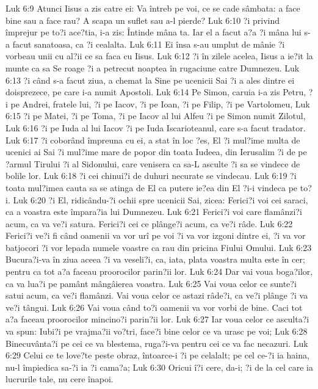 Luk 6:9  Atunci Iisus a zis catre ei: Va întreb pe voi, ce se cade sâmbata: a face bine sau a face rau? A scapa un suflet sau a-l pierde?
Luk 6:10  ?i privind împrejur pe to?i ace?tia, i-a zis: Întinde mâna ta. Iar el a facut a?a ?i mâna lui s-a facut sanatoasa, ca ?i cealalta.
Luk 6:11  Ei însa s-au umplut de mânie ?i vorbeau unii cu al?ii ce sa faca cu Iisus.
Luk 6:12  ?i în zilele acelea, Iisus a ie?it la munte ca sa Se roage ?i a petrecut noaptea în rugaciune catre Dumnezeu.
Luk 6:13  ?i când s-a facut ziua, a chemat la Sine pe ucenicii Sai ?i a ales dintre ei doisprezece, pe care i-a numit Apostoli.
Luk 6:14  Pe Simon, caruia i-a zis Petru, ?i pe Andrei, fratele lui, ?i pe Iacov, ?i pe Ioan, ?i pe Filip, ?i pe Vartolomeu,
Luk 6:15  ?i pe Matei, ?i pe Toma, ?i pe Iacov al lui Alfeu ?i pe Simon numit Zilotul,
Luk 6:16  ?i pe Iuda al lui Iacov ?i pe Iuda Iscarioteanul, care s-a facut tradator.
Luk 6:17  ?i coborând împreuna cu ei, a stat în loc ?es, El ?i mul?ime multa de ucenici ai Sai ?i mul?ime mare de popor din toata Iudeea, din Ierusalim ?i de pe ?armul Tirului ?i al Sidonului, care venisera ca sa-L asculte ?i sa se vindece de bolile lor.
Luk 6:18  ?i cei chinui?i de duhuri necurate se vindecau.
Luk 6:19  ?i toata mul?imea cauta sa se atinga de El ca putere ie?ea din El ?i-i vindeca pe to?i.
Luk 6:20  ?i El, ridicându-?i ochii spre ucenicii Sai, zicea: Ferici?i voi cei saraci, ca a voastra este împara?ia lui Dumnezeu.
Luk 6:21  Ferici?i voi care flamânzi?i acum, ca va ve?i satura. Ferici?i cei ce plânge?i acum, ca ve?i râde.
Luk 6:22  Ferici?i ve?i fi când oamenii va vor urî pe voi ?i va vor izgoni dintre ei, ?i va vor batjocori ?i vor lepada numele voastre ca rau din pricina Fiului Omului.
Luk 6:23  Bucura?i-va în ziua aceea ?i va veseli?i, ca, iata, plata voastra multa este în cer; pentru ca tot a?a faceau proorocilor parin?ii lor.
Luk 6:24  Dar vai voua boga?ilor, ca va lua?i pe pamânt mângâierea voastra.
Luk 6:25  Vai voua celor ce sunte?i satui acum, ca ve?i flamânzi. Vai voua celor ce astazi râde?i, ca ve?i plânge ?i va ve?i tângui.
Luk 6:26  Vai voua când to?i oamenii va vor vorbi de bine. Caci tot a?a faceau proorocilor mincino?i parin?ii lor.
Luk 6:27  Iar voua celor ce asculta?i va spun: Iubi?i pe vrajma?ii vo?tri, face?i bine celor ce va urasc pe voi;
Luk 6:28  Binecuvânta?i pe cei ce va blestema, ruga?i-va pentru cei ce va fac necazuri.
Luk 6:29  Celui ce te love?te peste obraz, întoarce-i ?i pe celalalt; pe cel ce-?i ia haina, nu-l împiedica sa-?i ia ?i cama?a;
Luk 6:30  Oricui î?i cere, da-i; ?i de la cel care ia lucrurile tale, nu cere înapoi.
